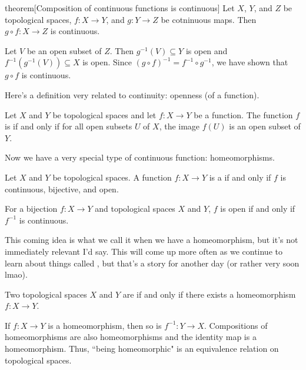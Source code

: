 \documentclass[class=article, crop=false]{standalone}
\begin{document}
\begin{result}{theorem}[Composition of continuous functions is continuous]
  Let $X$, $Y$, and $Z$ be topological spaces, $f \colon X \to Y$, and $g \colon Y \to Z$ be cotninuous maps. Then $g \circ f \colon X \to Z$ is continuous.
\end{result}
\begin{pf}
  Let $V$ be an open subset of $Z$. Then $g^{-1}(V) \subseteq Y$ is open and $f^{-1}(g^{-1}(V)) \subseteq X$ is open. Since $(g \circ f)^{-1} = f^{-1} \circ g^{-1}$, we have shown that $g \circ f$ is continuous.
\end{pf}

Here's a definition very related to continuity: openness (of a function).

\begin{defn}
  Let $X$ and $Y$ be topological spaces and let $f \colon X \to Y$ be a function. The function $f$ is  if and only if for all open subsets $U$ of $X$, the image $f(U)$ is an open subset of $Y$.
\end{defn}

Now we have a very special type of continuous function: homeomorphisms.
\begin{defn}[Homeomorphism]
  Let $X$ and $Y$ be topological spaces. A function $f \colon X \to Y$ is a  if and only if $f$ is continuous, bijective, and open.
\end{defn}
\begin{rem}
  For a bijection $f \colon X \to Y$ and topological spaces $X$ and $Y$, $f$ is open if and only if $f^{-1}$ is continuous.
\end{rem}

This coming idea is what we call it when we have a homeomorphism, but it's not immediately relevant I'd say. This will come up more often as we continue to learn about things called , but that's a story for another day (or rather very soon lmao).

\begin{defn}
  Two topological spaces $X$ and $Y$ are  if and only if there exists a homeomorphism $f \colon X \to Y$.
\end{defn}

\begin{rem}
  If $f \colon X \to Y$ is a homeomorphism, then so is $f^{-1} \colon Y \to X$. Compositions of homeomorphisms are also homeomorphisms and the identity map is a homeomorphism. Thus, ``being homeomorphic" is an equivalence relation on topological spaces.
\end{rem}
\end{document}

